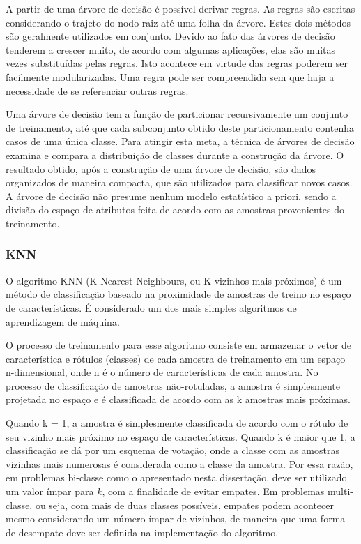 A partir de uma árvore de decisão é possível derivar regras. As regras são escritas considerando o trajeto do nodo raiz até uma folha da árvore. Estes dois métodos são geralmente utilizados em conjunto. Devido ao fato das árvores de decisão tenderem a crescer muito, de acordo com algumas aplicações, elas são muitas vezes substituídas pelas regras. Isto acontece em virtude das regras poderem ser facilmente modularizadas. Uma regra pode ser compreendida sem que haja a necessidade de se referenciar outras regras.

Uma árvore de decisão tem a função de particionar recursivamente um conjunto de treinamento, até que cada subconjunto obtido deste particionamento contenha casos de uma única classe. Para atingir esta meta, a técnica de árvores de decisão examina e compara a distribuição de classes durante a construção da árvore. O resultado obtido, após a construção de uma árvore de decisão, são dados organizados de maneira compacta, que são utilizados para classificar novos casos. A árvore de decisão não presume nenhum modelo estatístico a priori, sendo a divisão do espaço de atributos feita de acordo com as amostras provenientes do treinamento.

\subsubsection*{KNN}

O algoritmo KNN (K-Nearest Neighbours, ou K vizinhos mais próximos) \cite{cover:1967} é um método de classificação baseado na proximidade de amostras de treino no espaço de características. É considerado um dos mais simples algoritmos de aprendizagem de máquina.

O processo de treinamento para esse algoritmo consiste em armazenar o vetor de característica e rótulos (classes) de cada amostra de treinamento em um espaço n-dimensional, onde n é o número de características de cada amostra. No processo de classificação de amostras não-rotuladas, a amostra é simplesmente projetada no espaço e é classificada de acordo com as k amostras mais próximas.

Quando k = 1, a amostra é simplesmente classificada de acordo com o rótulo de seu vizinho mais próximo no espaço de características. Quando k é maior que 1, a classificação se dá por um esquema de votação, onde a classe com as amostras vizinhas mais numerosas é considerada como a classe da amostra. Por essa razão, em problemas bi-classe como o apresentado nesta dissertação, deve ser utilizado um valor ímpar para $k$, com a finalidade de evitar empates. Em problemas multi-classe, ou seja, com mais de duas classes possíveis, empates podem acontecer mesmo considerando um número ímpar de vizinhos, de maneira que uma forma de desempate deve ser definida na implementação do algoritmo.

